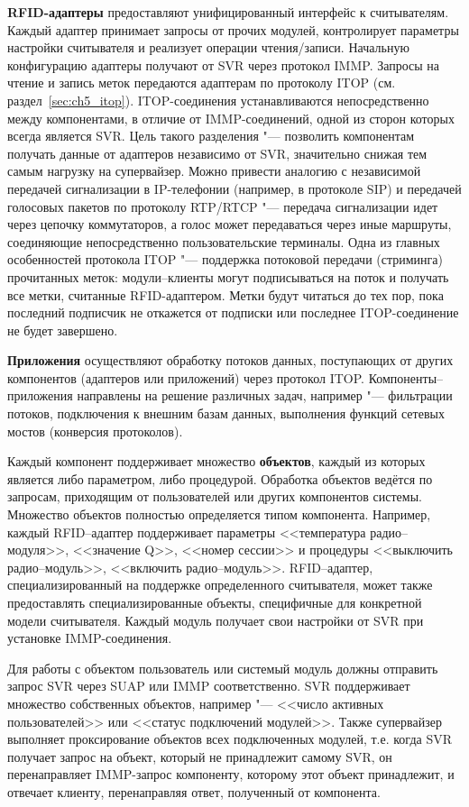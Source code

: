 \textbf{RFID-адаптеры} предоставляют унифицированный интерфейс к считывателям. Каждый адаптер принимает запросы от прочих модулей, контролирует параметры настройки считывателя и реализует операции чтения/записи. Начальную конфигурацию адаптеры получают от SVR через протокол IMMP. Запросы на чтение и запись меток передаются адаптерам по протоколу ITOP (см. раздел~\ref{sec:ch5_itop}). ITOP-соединения устанавливаются непосредственно между компонентами, в отличие от IMMP-соединений, одной из сторон которых всегда является SVR. Цель такого разделения "--- позволить компонентам получать данные от адаптеров независимо от SVR, значительно снижая тем самым нагрузку на супервайзер. Можно привести аналогию с независимой передачей сигнализации в IP-телефонии (например, в протоколе SIP) и передачей голосовых пакетов по протоколу RTP/RTCP "--- передача сигнализации идет через цепочку коммутаторов, а голос может передаваться через иные маршруты, соединяющие непосредственно пользовательские терминалы. Одна из главных особенностей протокола ITOP "--- поддержка потоковой передачи (стриминга) прочитанных меток: модули--клиенты могут подписываться на поток и получать все метки, считанные RFID-адаптером. Метки будут читаться до тех пор, пока последний подписчик не откажется от подписки или последнее ITOP-соединение не будет завершено.

\textbf{Приложения} осуществляют обработку потоков данных, поступающих от других компонентов (адаптеров или приложений) через протокол ITOP. Компоненты--приложения направлены на решение различных задач, например "--- фильтрации потоков, подключения к внешним базам данных, выполнения функций сетевых мостов (конверсия протоколов).

Каждый компонент поддерживает множество \textbf{объектов}, каждый из которых является либо параметром, либо процедурой. Обработка объектов ведётся по запросам, приходящим от пользователей или других компонентов системы. Множество объектов полностью определяется типом компонента. Например, каждый RFID--адаптер поддерживает параметры <<температура радио--модуля>>, <<значение Q>>, <<номер сессии>> и процедуры <<выключить радио--модуль>>, <<включить радио--модуль>>. RFID--адаптер, специализированный на поддержке определенного считывателя, может также предоставлять специализированные объекты, специфичные для конкретной модели считывателя. Каждый модуль получает свои настройки от SVR при установке IMMP-соединения.

Для работы с объектом пользователь или системый модуль должны отправить запрос SVR через SUAP или IMMP соответственно. SVR поддерживает множество собственных объектов, например "--- <<число активных пользователей>> или <<статус подключений модулей>>. Также супервайзер выполняет проксирование объектов всех подключенных модулей, т.е. когда SVR получает запрос на объект, который не принадлежит самому SVR, он перенаправляет IMMP-запрос компоненту, которому этот объект принадлежит, и отвечает клиенту, перенаправляя ответ, полученный от компонента.


